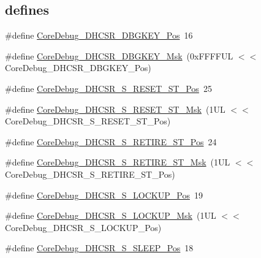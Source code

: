 \subsection*{\textquotesingle{}defines\textquotesingle{}}
\begin{DoxyCompactItemize}
\item 
\#define \hyperlink{group___c_m_s_i_s___core_debug_gac91280edd0ce932665cf75a23d11d842}{Core\+Debug\+\_\+\+D\+H\+C\+S\+R\+\_\+\+D\+B\+G\+K\+E\+Y\+\_\+\+Pos}~16
\item 
\#define \hyperlink{group___c_m_s_i_s___core_debug_ga1ce997cee15edaafe4aed77751816ffc}{Core\+Debug\+\_\+\+D\+H\+C\+S\+R\+\_\+\+D\+B\+G\+K\+E\+Y\+\_\+\+Msk}~(0x\+F\+F\+F\+F\+U\+L $<$$<$ Core\+Debug\+\_\+\+D\+H\+C\+S\+R\+\_\+\+D\+B\+G\+K\+E\+Y\+\_\+\+Pos)
\item 
\#define \hyperlink{group___c_m_s_i_s___core_debug_ga6f934c5427ea057394268e541fa97753}{Core\+Debug\+\_\+\+D\+H\+C\+S\+R\+\_\+\+S\+\_\+\+R\+E\+S\+E\+T\+\_\+\+S\+T\+\_\+\+Pos}~25
\item 
\#define \hyperlink{group___c_m_s_i_s___core_debug_gac474394bcceb31a8e09566c90b3f8922}{Core\+Debug\+\_\+\+D\+H\+C\+S\+R\+\_\+\+S\+\_\+\+R\+E\+S\+E\+T\+\_\+\+S\+T\+\_\+\+Msk}~(1\+U\+L $<$$<$ Core\+Debug\+\_\+\+D\+H\+C\+S\+R\+\_\+\+S\+\_\+\+R\+E\+S\+E\+T\+\_\+\+S\+T\+\_\+\+Pos)
\item 
\#define \hyperlink{group___c_m_s_i_s___core_debug_ga2328118f8b3574c871a53605eb17e730}{Core\+Debug\+\_\+\+D\+H\+C\+S\+R\+\_\+\+S\+\_\+\+R\+E\+T\+I\+R\+E\+\_\+\+S\+T\+\_\+\+Pos}~24
\item 
\#define \hyperlink{group___c_m_s_i_s___core_debug_ga89dceb5325f6bcb36a0473d65fbfcfa6}{Core\+Debug\+\_\+\+D\+H\+C\+S\+R\+\_\+\+S\+\_\+\+R\+E\+T\+I\+R\+E\+\_\+\+S\+T\+\_\+\+Msk}~(1\+U\+L $<$$<$ Core\+Debug\+\_\+\+D\+H\+C\+S\+R\+\_\+\+S\+\_\+\+R\+E\+T\+I\+R\+E\+\_\+\+S\+T\+\_\+\+Pos)
\item 
\#define \hyperlink{group___c_m_s_i_s___core_debug_ga2900dd56a988a4ed27ad664d5642807e}{Core\+Debug\+\_\+\+D\+H\+C\+S\+R\+\_\+\+S\+\_\+\+L\+O\+C\+K\+U\+P\+\_\+\+Pos}~19
\item 
\#define \hyperlink{group___c_m_s_i_s___core_debug_ga7b67e4506d7f464ef5dafd6219739756}{Core\+Debug\+\_\+\+D\+H\+C\+S\+R\+\_\+\+S\+\_\+\+L\+O\+C\+K\+U\+P\+\_\+\+Msk}~(1\+U\+L $<$$<$ Core\+Debug\+\_\+\+D\+H\+C\+S\+R\+\_\+\+S\+\_\+\+L\+O\+C\+K\+U\+P\+\_\+\+Pos)
\item 
\#define \hyperlink{group___c_m_s_i_s___core_debug_ga349ccea33accc705595624c2d334fbcb}{Core\+Debug\+\_\+\+D\+H\+C\+S\+R\+\_\+\+S\+\_\+\+S\+L\+E\+E\+P\+\_\+\+Pos}~18

\end{DoxyCompactItemize}

